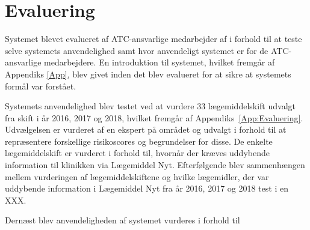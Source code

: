 \section{Evaluering}
Systemet blevet evalueret af ATC-ansvarlige medarbejder af i forhold til at teste selve systemets anvendelighed samt hvor anvendeligt systemet er for de ATC-ansvarlige medarbejdere. En introduktion til systemet, hvilket fremgår af Appendiks \ref{App}, blev givet inden det blev evalueret for at sikre at systemets formål var forstået.

Systemets anvendelighed blev testet ved at vurdere 33 lægemiddelskift udvalgt fra skift i år 2016, 2017 og 2018, hvilket fremgår af Appendiks~\ref{App:Evaluering}. Udvælgelsen er vurderet af en ekspert på området og udvalgt i forhold til at repræsentere forskellige risikoscores og begrundelser for disse.
De enkelte lægemiddelskift er vurderet i forhold til, hvornår der kræves uddybende information til klinikken via Lægemiddel Nyt.
Efterfølgende blev sammenhængen mellem vurderingen af lægemiddelskiftene og hvilke lægemidler, der var uddybende information i Lægemiddel Nyt fra år 2016, 2017 og 2018 test i en XXX.

Dernæst blev anvendeligheden af systemet vurderes i forhold til 







